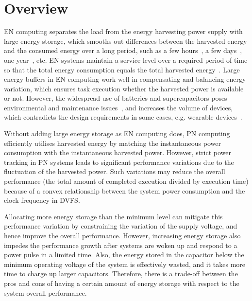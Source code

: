\section{Overview}


EN computing separates the load from the energy harvesting power supply with large energy storage, which smooths out differences between the harvested energy and the consumed energy over a long period, such as a few hours~\cite{kansal2007power}, a few days~\cite{sharma2010cloudy}, one year~\cite{buchli2014dynamic}, etc. EN systems maintain a service level over a required period of time so that the total energy consumption equals the total harvested energy~\cite{kansal2007power}. Large energy buffers in EN computing work well in compensating and balancing energy variation, which ensures task execution whether the harvested power is available or not. However, the widespread use of batteries and supercapacitors poses environmental and maintenance issues~\cite{peng2012throughput, raghunathan2005design}, and increases the volume of devices, which contradicts the design requirements in some cases, e.g. wearable devices~\cite{mitcheson2010energy, acampora2013survey}.

Without adding large energy storage as EN computing does, PN computing efficiently utilises harvested energy by matching the instantaneous power consumption with the instantaneous harvested power. However, strict power tracking in PN systems leads to significant performance variations due to the fluctuation of the harvested power. Such variations may reduce the overall performance (the total amount of completed execution divided by execution time) because of a convex relationship between the system power consumption and the clock frequency in DVFS.

Allocating more energy storage than the minimum level can mitigate this performance variation by constraining the variation of the supply voltage, and hence improve the overall performance. However, increasing energy storage also impedes the performance growth after systems are woken up and respond to a power pulse in a limited time. Also, the energy stored in the capacitor below the minimum operating voltage of the system is effectively wasted, and it takes more time to charge up larger capacitors. Therefore, there is a trade-off between the pros and cons of having a certain amount of energy storage with respect to the system overall performance. 

